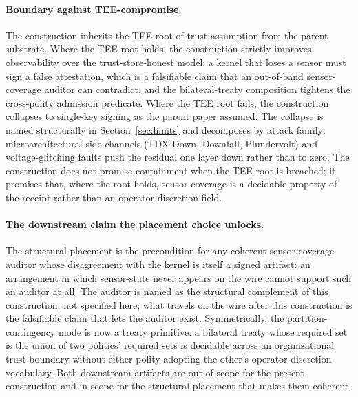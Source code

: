 \paragraph{Boundary against TEE-compromise.}
The construction inherits the TEE root-of-trust assumption from the parent substrate. Where the TEE root holds, the construction strictly improves observability over the trust-store-honest model: a kernel that loses a sensor must sign a false attestation, which is a falsifiable claim that an out-of-band sensor-coverage auditor can contradict, and the bilateral-treaty composition tightens the cross-polity admission predicate. Where the TEE root fails, the construction collapses to single-key signing as the parent paper assumed. The collapse is named structurally in Section~\ref{sec:limits} and decomposes by attack family: microarchitectural side channels (TDX-Down, Downfall, Plundervolt) and voltage-glitching faults push the residual one layer down rather than to zero. The construction does not promise containment when the TEE root is breached; it promises that, where the root holds, sensor coverage is a decidable property of the receipt rather than an operator-discretion field.

\paragraph{The downstream claim the placement choice unlocks.}
The structural placement is the precondition for any coherent sensor-coverage auditor whose disagreement with the kernel is itself a signed artifact: an arrangement in which sensor-state never appears on the wire cannot support such an auditor at all. The auditor is named as the structural complement of this construction, not specified here; what travels on the wire after this construction is the falsifiable claim that lets the auditor exist. Symmetrically, the partition-contingency mode is now a treaty primitive: a bilateral treaty whose required set is the union of two polities' required sets is decidable across an organizational trust boundary without either polity adopting the other's operator-discretion vocabulary. Both downstream artifacts are out of scope for the present construction and in-scope for the structural placement that makes them coherent.
